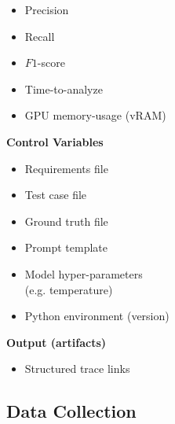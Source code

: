 \documentclass[conference]{IEEEtran}
\begin{document}
\begin{center}
\begin{tcbraster}[raster columns=2, raster column skip=5pt, raster equal height=rows, raster row skip=5pt]
\begin{roundedBox}
\begin{itemize}
                \item Precision
                \item Recall
                \item $F1$-score
                \item Time-to-analyze
                \item GPU memory-usage (vRAM)
            \end{itemize}
        \end{roundedBox}
        \begin{roundedBox}
            \centering 
            \textbf{Control Variables}
            \begin{itemize}
                \item Requirements file
                \item Test case file
                \item Ground truth file
                \item Prompt template
                \item Model hyper-parameters \\ (e.g. temperature)
                \item Python environment (version)
            \end{itemize}
        \end{roundedBox}
        \end{tcbraster}
        \begin{roundedBox}
            \centering
            \textbf{Output (artifacts)}
            \begin{itemize}
            \centering
                \item Structured trace links
            \end{itemize}
        \end{roundedBox}
\end{center}

\subsection{Data Collection}

%
%
%
%
% 
\end{document}

